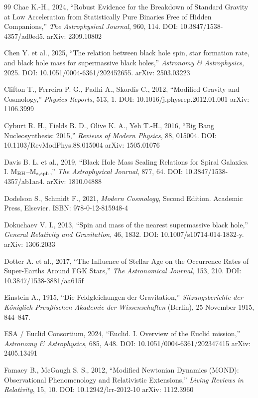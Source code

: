 \documentclass[11pt,a4paper]{article}
\begin{document}
{\begin{thebibliography}{99}
Chae K.-H., 2024, ``Robust Evidence for the Breakdown of Standard Gravity at Low Acceleration from Statistically Pure Binaries Free of Hidden Companions,'' \emph{The Astrophysical Journal}, 960, 114. DOI: 10.3847/1538-4357/ad0ed5. arXiv: 2309.10802

Chen Y. et al., 2025, ``The relation between black hole spin, star formation rate, and black hole mass for supermassive black holes,'' \emph{Astronomy \& Astrophysics}, 2025. DOI: 10.1051/0004-6361/202452655. arXiv: 2503.03223

Clifton T., Ferreira P. G., Padhi A., Skordis C., 2012, ``Modified Gravity and Cosmology,'' \emph{Physics Reports}, 513, 1. DOI: 10.1016/j.physrep.2012.01.001 arXiv: 1106.3999

Cyburt R. H., Fields B. D., Olive K. A., Yeh T.-H., 2016, ``Big Bang Nucleosynthesis: 2015,'' \emph{Reviews of Modern Physics}, 88, 015004. DOI: 10.1103/RevModPhys.88.015004 arXiv: 1505.01076

Davis B. L. et al., 2019, ``Black Hole Mass Scaling Relations for Spiral Galaxies. I. M$_{\rm BH}$--M$_{*,{\rm sph}}$,'' \emph{The Astrophysical Journal}, 877, 64. DOI: 10.3847/1538-4357/ab1aa4. arXiv: 1810.04888

Dodelson S., Schmidt F., 2021, \emph{Modern Cosmology}, Second Edition. Academic Press, Elsevier. ISBN: 978-0-12-815948-4

Dokuchaev V. I., 2013, ``Spin and mass of the nearest supermassive black hole,'' \emph{General Relativity and Gravitation}, 46, 1832. DOI: 10.1007/s10714-014-1832-y. arXiv: 1306.2033

Dotter A. et al., 2017, ``The Influence of Stellar Age on the Occurrence Rates of Super-Earths Around FGK Stars,'' \emph{The Astronomical Journal}, 153, 210. DOI: 10.3847/1538-3881/aa615f

Einstein A., 1915, ``Die Feldgleichungen der Gravitation,'' \emph{Sitzungsberichte der Königlich Preußischen Akademie der Wissenschaften} (Berlin), 25 November 1915, 844--847.

ESA / Euclid Consortium, 2024, ``Euclid. I. Overview of the Euclid mission,'' \emph{Astronomy \& Astrophysics}, 685, A48. DOI: 10.1051/0004-6361/202347415 arXiv: 2405.13491

Famaey B., McGaugh S. S., 2012, ``Modified Newtonian Dynamics (MOND): Observational Phenomenology and Relativistic Extensions,'' \emph{Living Reviews in Relativity}, 15, 10. DOI: 10.12942/lrr-2012-10 arXiv: 1112.3960


\end{thebibliography}}
\end{document}

